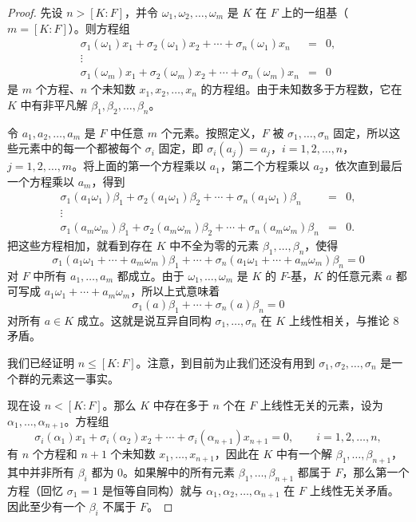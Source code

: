 \begin{proof}
先设 $n>[K:F]$，并令 $\omega_1,\omega_2,\ldots,\omega_m$ 是 $K$ 在 $F$ 上的一组基（$m=[K:F]$）。则方程组
\[
\begin{array}{rcl}
\sigma_1(\omega_1)x_1+\sigma_2(\omega_1)x_2+\cdots+\sigma_n(\omega_1)x_n&=&0,\\
\vdots&&\\
\sigma_1(\omega_m)x_1+\sigma_2(\omega_m)x_2+\cdots+\sigma_n(\omega_m)x_n&=&0
\end{array}
\]
是 $m$ 个方程、$n$ 个未知数 $x_1,x_2,\ldots,x_n$ 的方程组。由于未知数多于方程数，它在 $K$ 中有非平凡解 $\beta_1,\beta_2,\ldots,\beta_n$。

令 $a_1,a_2,\ldots,a_m$ 是 $F$ 中任意 $m$ 个元素。按照定义，$F$ 被 $\sigma_1,\ldots,\sigma_n$ 固定，所以这些元素中的每一个都被每个 $\sigma_i$ 固定，即 $\sigma_i(a_j)=a_j$，$i=1,2,\ldots,n$，$j=1,2,\ldots,m$。将上面的第一个方程乘以 $a_1$，第二个方程乘以 $a_2$，依次直到最后一个方程乘以 $a_m$，得到
\[
\begin{array}{rcl}
\sigma_1(a_1\omega_1)\beta_1+\sigma_2(a_1\omega_1)\beta_2+\cdots+\sigma_n(a_1\omega_1)\beta_n&=&0,\\
\vdots&&\\
\sigma_1(a_m\omega_m)\beta_1+\sigma_2(a_m\omega_m)\beta_2+\cdots+\sigma_n(a_m\omega_m)\beta_n&=&0.
\end{array}
\]
把这些方程相加，就看到存在 $K$ 中不全为零的元素 $\beta_1,\ldots,\beta_n$，使得
\[
\sigma_1(a_1\omega_1+\cdots+a_m\omega_m)\beta_1+\cdots+
\sigma_n(a_1\omega_1+\cdots+a_m\omega_m)\beta_n=0
\]
对 $F$ 中所有 $a_1,\ldots,a_m$ 都成立。由于 $\omega_1,\ldots,\omega_m$ 是 $K$ 的 $F$-基，$K$ 的任意元素 $a$ 都可写成 $a_1\omega_1+\cdots+a_m\omega_m$，所以上式意味着
\[
\sigma_1(a)\beta_1+\cdots+\sigma_n(a)\beta_n=0
\]
对所有 $a\in K$ 成立。这就是说互异自同构 $\sigma_1,\ldots,\sigma_n$ 在 $K$ 上线性相关，与推论 8 矛盾。

我们已经证明 $n\leq [K:F]$。注意，到目前为止我们还没有用到 $\sigma_1,\sigma_2,\ldots,\sigma_n$ 是一个群的元素这一事实。

现在设 $n<[K:F]$。那么 $K$ 中存在多于 $n$ 个在 $F$ 上线性无关的元素，设为 $\alpha_1,
\ldots,\alpha_{n+1}$。方程组
\begin{equation}
\sigma_i(\alpha_1)x_1+\sigma_i(\alpha_2)x_2+\cdots+\sigma_i(\alpha_{n+1})x_{n+1}=0,
\qquad i=1,2,\ldots,n,
\tag{14.5}
\end{equation}
有 $n$ 个方程和 $n+1$ 个未知数 $x_1,
\ldots,x_{n+1}$，因此在 $K$ 中有一个解 $\beta_1,
\ldots,\beta_{n+1}$，其中并非所有 $\beta_i$ 都为 $0$。如果解中的所有元素 $\beta_1,
\ldots,\beta_{n+1}$ 都属于 $F$，那么第一个方程（回忆 $\sigma_1=1$ 是恒等自同构）就与 $\alpha_1,
\alpha_2,
\ldots,
\alpha_{n+1}$ 在 $F$ 上线性无关矛盾。因此至少有一个 $\beta_i$ 不属于 $F$。


\end{proof}
